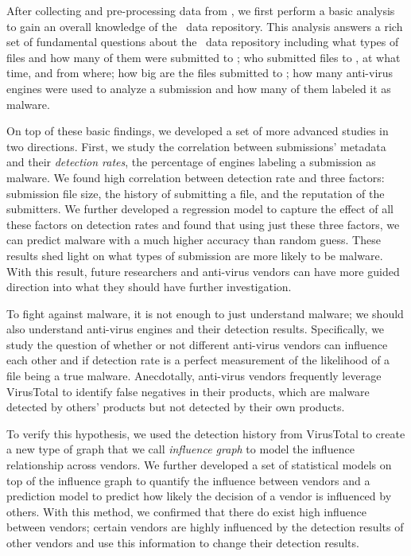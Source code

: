 After collecting and pre-processing data from \vt, 
we first perform a basic analysis to gain an overall knowledge of the \vt\ data repository.
This analysis answers a rich set of fundamental questions about the \vt\ data repository
including what types of files and how many of them were submitted to \vt;
who submitted files to \vt, at what time, and from where;
how big are the files submitted to \vt;
how many anti-virus engines were used to analyze a submission and how many of them labeled it as malware.

On top of these basic findings, we developed a set of more advanced studies in two directions. 
First, we study the correlation between submissions' metadata and their {\em detection rates}, 
the percentage of engines labeling a submission as malware. 
We found high correlation between detection rate 
and three factors: submission file size, the history of submitting a file, and the reputation of the submitters.
We further developed a regression model to capture the effect of all these factors on detection rates
and found that using just these three factors, we can predict malware with a much higher accuracy than random guess.
These results shed light on what types of submission are more likely to be malware.
With this result, future researchers and anti-virus vendors can have more guided direction 
into what they should have further investigation.

To fight against malware, it is not enough to just understand malware;
we should also understand anti-virus engines and their detection results.
Specifically, we study the question of whether or not different anti-virus vendors can influence each other
and if detection rate is a perfect measurement of the likelihood of a file being a true malware.
Anecdotally, anti-virus vendors frequently leverage VirusTotal to identify false negatives in their products, 
which are malware detected by others' products but not detected by their own products. 

To verify this hypothesis, we used the detection history from VirusTotal to create a new type of graph that we call 
{\em influence graph} to model the influence relationship across vendors.
We further developed a set of statistical models on top of the influence graph to quantify the influence between vendors
and a prediction model to predict how likely the decision of a vendor is influenced by others. 
With this method, we confirmed that there do exist high influence between vendors;
certain vendors are highly influenced by the detection results of other vendors 
and use this information to change their detection results.


